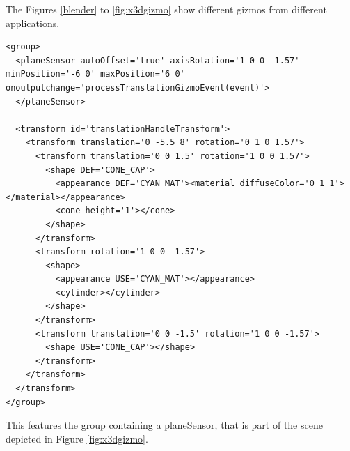 The Figures \ref{blender} to \ref{fig:x3dgizmo} show different gizmos from
different applications.

\begin{listing}
  \begin{verbatim}
<group>
  <planeSensor autoOffset='true' axisRotation='1 0 0 -1.57' minPosition='-6 0' maxPosition='6 0' onoutputchange='processTranslationGizmoEvent(event)'>
  </planeSensor>

  <transform id='translationHandleTransform'>
    <transform translation='0 -5.5 8' rotation='0 1 0 1.57'>
      <transform translation='0 0 1.5' rotation='1 0 0 1.57'>
        <shape DEF='CONE_CAP'>
          <appearance DEF='CYAN_MAT'><material diffuseColor='0 1 1'></material></appearance>
          <cone height='1'></cone>
        </shape>
      </transform>
      <transform rotation='1 0 0 -1.57'>
        <shape>
          <appearance USE='CYAN_MAT'></appearance>
          <cylinder></cylinder>
        </shape>
      </transform>
      <transform translation='0 0 -1.5' rotation='1 0 0 -1.57'>
        <shape USE='CONE_CAP'></shape>
      </transform>
    </transform>
  </transform>
</group>
  \end{verbatim}
  \caption{This features the group containing a planeSensor, that is part of the scene depicted in Figure \ref{fig:x3dgizmo}.}
  \label{planesensor}
\end{listing}

